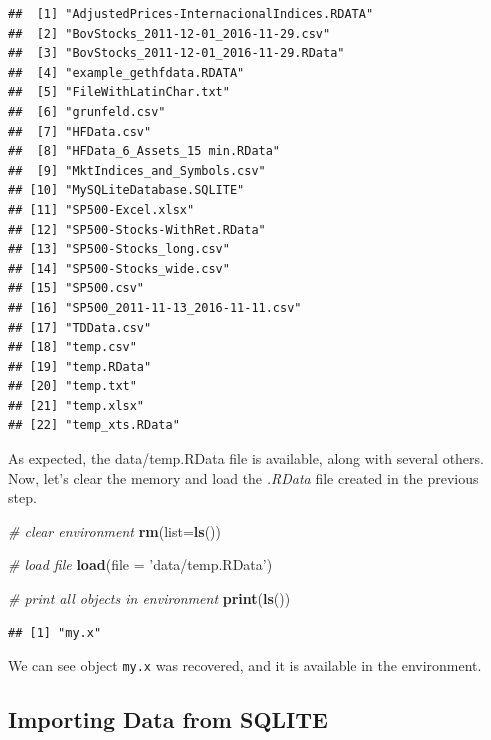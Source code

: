 \documentclass[11pt,]{book}
\newenvironment{Shaded}{\begin{snugshade}}{\end{snugshade}}
\newcommand{\KeywordTok}[1]{\textcolor[rgb]{0.27,0.27,0.27}{\textbf{#1}}}
\newcommand{\DataTypeTok}[1]{\textcolor[rgb]{0.27,0.27,0.27}{#1}}
\newcommand{\StringTok}[1]{\textcolor[rgb]{0.5,0.5,0.5}{#1}}
\newcommand{\CommentTok}[1]{\textcolor[rgb]{0.56,0.35,0.01}{\textit{#1}}}
\newcommand{\NormalTok}[1]{#1}
\begin{document}
\begin{verbatim}
##  [1] "AdjustedPrices-InternacionalIndices.RDATA"
##  [2] "BovStocks_2011-12-01_2016-11-29.csv"      
##  [3] "BovStocks_2011-12-01_2016-11-29.RData"    
##  [4] "example_gethfdata.RDATA"                  
##  [5] "FileWithLatinChar.txt"                    
##  [6] "grunfeld.csv"                             
##  [7] "HFData.csv"                               
##  [8] "HFData_6_Assets_15 min.RData"             
##  [9] "MktIndices_and_Symbols.csv"               
## [10] "MySQLiteDatabase.SQLITE"                  
## [11] "SP500-Excel.xlsx"                         
## [12] "SP500-Stocks-WithRet.RData"               
## [13] "SP500-Stocks_long.csv"                    
## [14] "SP500-Stocks_wide.csv"                    
## [15] "SP500.csv"                                
## [16] "SP500_2011-11-13_2016-11-11.csv"          
## [17] "TDData.csv"                               
## [18] "temp.csv"                                 
## [19] "temp.RData"                               
## [20] "temp.txt"                                 
## [21] "temp.xlsx"                                
## [22] "temp_xts.RData"
\end{verbatim}

As expected, the data/temp.RData file is available, along with several
others. Now, let's clear the memory and load the \emph{.RData} file
created in the previous step.

\begin{Shaded}
\begin{Highlighting}[]
\CommentTok{# clear environment}
\KeywordTok{rm}\NormalTok{(}\DataTypeTok{list=}\KeywordTok{ls}\NormalTok{())}

\CommentTok{# load file}
\KeywordTok{load}\NormalTok{(}\DataTypeTok{file =} \StringTok{'data/temp.RData'}\NormalTok{)}

\CommentTok{# print all objects in environment}
\KeywordTok{print}\NormalTok{(}\KeywordTok{ls}\NormalTok{())}
\end{Highlighting}
\end{Shaded}

\begin{verbatim}
## [1] "my.x"
\end{verbatim}

We can see object \texttt{my.x} was recovered, and it is available in
the environment.

\subsection{Importing Data from
SQLITE}\label{importing-data-from-sqlite}
\end{document}
